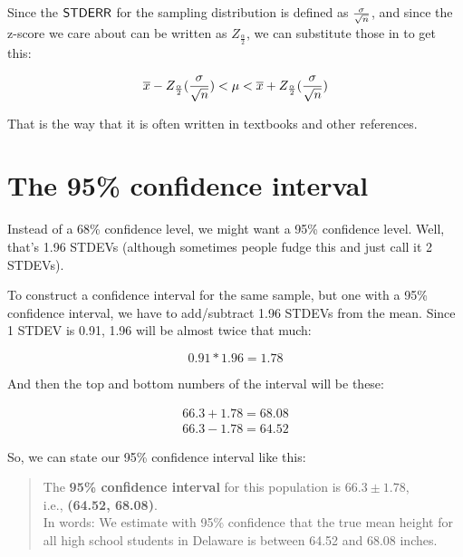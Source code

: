 \documentclass[../../../main.tex]{subfiles}
\begin{document}
Since the $\StdErr/$ for the sampling distribution is defined as $\frac{\populationstdev}{\sqrt{\samplesize/}}$, and since the z-score we care about can be written as $Z_{\frac{\alpha}{2}}$, we can substitute those in to get this:

\begin{equation*}
  \samplemean{x} - Z_{\frac{\alpha}{2}}(\frac{\populationstdev}{\sqrt{\samplesize/}}) < \populationmean < \samplemean{x} + Z_{\frac{\alpha}{2}}(\frac{\populationstdev}{\sqrt{\samplesize/}})
\end{equation*}

\noindent
That is the way that it is often written in textbooks and other references.


\section{The 95\% confidence interval}

Instead of a 68\% confidence level, we might want a 95\% confidence level. Well, that's 1.96 STDEVs (although sometimes people fudge this and just call it 2 STDEVs).

To construct a confidence interval for the same sample, but one with a 95\% confidence interval, we have to add/subtract 1.96 STDEVs from the mean. Since 1 STDEV is 0.91, 1.96 will be almost twice that much:

\begin{equation*}
  0.91 * 1.96 = 1.78  
\end{equation*}

\noindent
And then the top and bottom numbers of the interval will be these:

\begin{align*}
  66.3 + 1.78 = 68.08 \\
  66.3 - 1.78 = 64.52
\end{align*}

\noindent
So, we can state our 95\% confidence interval like this:

\begin{quote}
  The \textbf{95\% confidence interval} for this population is $\mathbf{66.3 \pm 1.78}$, \\
  i.e., \textbf{(64.52, 68.08)}. \\

  In words: We estimate with 95\% confidence that the true mean height for all high school students in Delaware is between 64.52 and 68.08 inches.
\end{quote}
\end{document}
